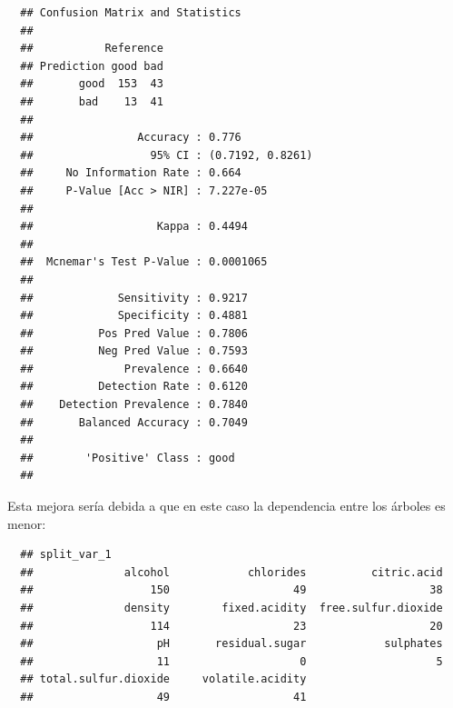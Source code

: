 \documentclass[
]{book}
\newenvironment{Shaded}{\begin{snugshade}}{\end{snugshade}}
\newcommand{\AttributeTok}[1]{\textcolor[rgb]{0.77,0.63,0.00}{#1}}
\newcommand{\ConstantTok}[1]{\textcolor[rgb]{0.00,0.00,0.00}{#1}}
\newcommand{\ControlFlowTok}[1]{\textcolor[rgb]{0.13,0.29,0.53}{\textbf{#1}}}
\newcommand{\DecValTok}[1]{\textcolor[rgb]{0.00,0.00,0.81}{#1}}
\newcommand{\FunctionTok}[1]{\textcolor[rgb]{0.00,0.00,0.00}{#1}}
\newcommand{\NormalTok}[1]{#1}
\newcommand{\OtherTok}[1]{\textcolor[rgb]{0.56,0.35,0.01}{#1}}
\newcommand{\SpecialCharTok}[1]{\textcolor[rgb]{0.00,0.00,0.00}{#1}}
\newcommand{\StringTok}[1]{\textcolor[rgb]{0.31,0.60,0.02}{#1}}
\theoremstyle{break}
\theoremstyle{nonumberplain}
\begin{document}
\begin{verbatim}
  ## Confusion Matrix and Statistics
  ## 
  ##           Reference
  ## Prediction good bad
  ##       good  153  43
  ##       bad    13  41
  ##                                           
  ##                Accuracy : 0.776           
  ##                  95% CI : (0.7192, 0.8261)
  ##     No Information Rate : 0.664           
  ##     P-Value [Acc > NIR] : 7.227e-05       
  ##                                           
  ##                   Kappa : 0.4494          
  ##                                           
  ##  Mcnemar's Test P-Value : 0.0001065       
  ##                                           
  ##             Sensitivity : 0.9217          
  ##             Specificity : 0.4881          
  ##          Pos Pred Value : 0.7806          
  ##          Neg Pred Value : 0.7593          
  ##              Prevalence : 0.6640          
  ##          Detection Rate : 0.6120          
  ##    Detection Prevalence : 0.7840          
  ##       Balanced Accuracy : 0.7049          
  ##                                           
  ##        'Positive' Class : good            
  ## 
\end{verbatim}

Esta mejora sería debida a que en este caso la dependencia entre los árboles es menor:

\begin{Shaded}
\end{Shaded}

\begin{verbatim}
  ## split_var_1
  ##              alcohol            chlorides          citric.acid 
  ##                  150                   49                   38 
  ##              density        fixed.acidity  free.sulfur.dioxide 
  ##                  114                   23                   20 
  ##                   pH       residual.sugar            sulphates 
  ##                   11                    0                    5 
  ## total.sulfur.dioxide     volatile.acidity 
  ##                   49                   41
\end{verbatim}
\end{document}

